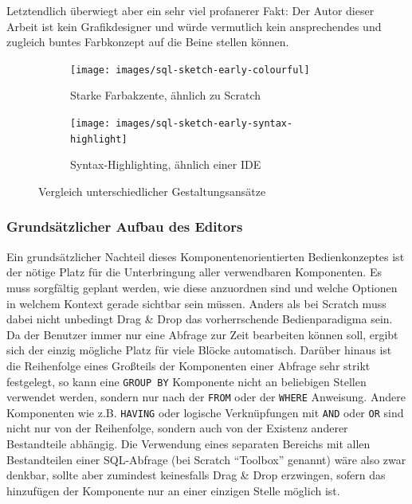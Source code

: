 Letztendlich überwiegt aber ein sehr viel profanerer Fakt: Der Autor dieser Arbeit ist kein Grafikdesigner und würde vermutlich kein ansprechendes und zugleich buntes Farbkonzept auf die Beine stellen können.

\begin{figure}
  \begin{subfigure}[b]{0.45\textwidth}
    \texttt{[image: images/sql-sketch-early-colourful]}
    \caption{Starke Farbakzente, ähnlich zu Scratch}
    \label{fig:screen-sql-editor-early-colourful}
  \end{subfigure}\hfill
  \begin{subfigure}[b]{0.45\textwidth}
    \texttt{[image: images/sql-sketch-early-syntax-highlight]}
    \caption{Syntax-Highlighting, ähnlich einer IDE}
    \label{fig:screen-sql-editor-early-syntax-highlighting}
  \end{subfigure}
  \caption{Vergleich unterschiedlicher Gestaltungsansätze}
  \label{fig:compare-colourful}
\end{figure}

\subsubsection{Grundsätzlicher Aufbau des Editors}

Ein grundsätzlicher Nachteil dieses Komponentenorientierten Bedienkonzeptes ist der nötige Platz für die Unterbringung aller verwendbaren Komponenten. Es muss sorgfältig geplant werden, wie diese anzuordnen sind und welche Optionen in welchem Kontext gerade sichtbar sein müssen. Anders als bei Scratch muss dabei nicht unbedingt Drag \& Drop das vorherrschende Bedienparadigma sein. Da der Benutzer immer nur eine Abfrage zur Zeit bearbeiten können soll, ergibt sich der einzig mögliche Platz für viele Blöcke automatisch. Darüber hinaus ist die Reihenfolge eines Großteils der Komponenten einer Abfrage sehr strikt festgelegt, so kann eine \texttt{GROUP BY} Komponente nicht an beliebigen Stellen verwendet werden, sondern nur nach der \texttt{FROM} oder der \texttt{WHERE} Anweisung. Andere Komponenten wie z.B. \texttt{HAVING} oder logische Verknüpfungen mit \texttt{AND} oder \texttt{OR} sind nicht nur von der Reihenfolge, sondern auch von der Existenz anderer Bestandteile abhängig. Die Verwendung eines separaten Bereichs mit allen Bestandteilen einer SQL-Abfrage (bei Scratch ``Toolbox'' genannt) wäre also zwar denkbar, sollte aber zumindest keinesfalls Drag \& Drop erzwingen, sofern das hinzufügen der Komponente nur an einer einzigen Stelle möglich ist.

